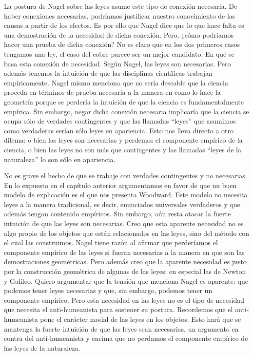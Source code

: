 La postura de Nagel sobre las leyes asume este tipo de conexión necesaria. De haber conexiones necesarias, podríamos justificar nuestro conocimiento de las causas a partir de los efectos. Es por ello que Nagel dice que lo que hace falta es una demostración de la necesidad de dicha conexión. Pero, ¿cómo podríamos hacer una prueba de dicha conexión? No es claro que en los dos primeros casos tengamos una ley, el caso del cobre parece ser un mejor candidato. En qué se basa esta conexión de necesidad. Según Nagel, las leyes son necesarias. Pero además tenemos la intuición de que las disciplinas científicas trabajan empíricamente. Nagel mismo menciona que no sería deseable que la ciencia proceda en términos de prueba necesaria a la manera en como lo hace la geometría \cite[cfr., p. 53]{Nagel2006} porque se perdería la intuición de que la ciencia es fundamentalmente empírica. Sin embargo, negar dicha conexión necesaria implicaría que la ciencia se ocupa sólo de verdades contingentes  y que las llamadas ``leyes'' que asumimos como verdaderas serían sólo leyes en apariencia. Esto nos lleva directo a otro dilema: o bien las leyes son necesarias y perdemos el componente empírico de la ciencia, o bien las leyes no son más que contingentes y las llamadas ``leyes de la naturaleza'' lo son sólo en apariencia.

No es grave el hecho de que se trabaje con verdades contingentes y no necesarias. En lo expuesto en el capítulo anterior argumentamos en favor de que un buen modelo de explicación es el que nos presenta Woodward. Este modelo no necesita leyes a la manera tradicional, es decir, enunciados universales verdaderos y que además tengan contenido empíricos. Sin embargo, aún resta atacar la fuerte intuición de que las leyes son necesarias. Creo que esta aparente necesidad no es algo propio de los objetos que están relacionados en las leyes, sino del método con el cual las construimos. Nagel tiene razón al afirmar que perderíamos el componente empírico de las leyes si fueran necesarias a la manera en que son las demostraciones geométricas. Pero además creo que la aparente necesidad es justo por la construcción geométrica de algunas de las leyes: en especial las de Newton y Galileo. Quiero argumentar que la tensión que menciona Nagel es aparente: que podemos tener leyes necesarias y que, sin embargo, podemos tener un componente empírico. Pero esta necesidad en las leyes no es el tipo de necesidad que necesita el anti-humeanista para sostener su postura. Recordemos que el anti-humeanista pone el carácter modal de las leyes en los objetos. Esto hará que se mantenga la fuerte intuición de que las leyes sean necesarias, un argumento en contra del anti-humeanista y encima que no perdamos el componente empírico de las leyes de la naturaleza.

